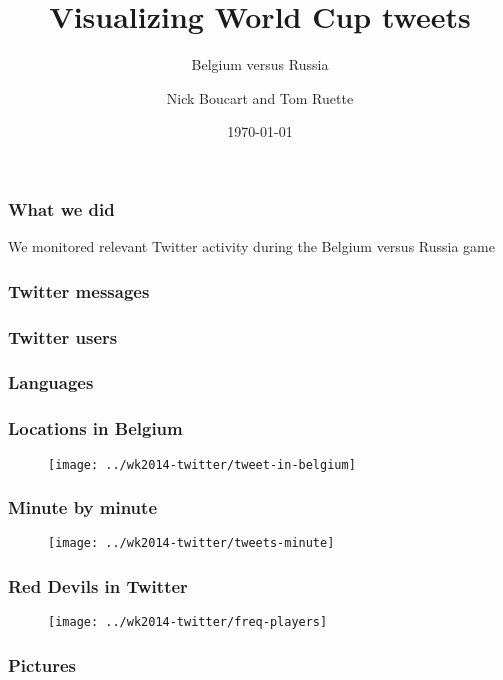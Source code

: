 \documentclass{beamer}
\title[\#belrus]{Visualizing World Cup tweets}
\subtitle{Belgium versus Russia}
\author[Sirris]{Nick Boucart and Tom Ruette}
\institute[Sirris]{Sirris, Collective Centre for the Belgian Technological Industry}
\date{\today}
\begin{document}
  \frame{\titlepage}

  \begin{frame}
    \frametitle{What we did}
      We monitored relevant Twitter activity during the Belgium versus Russia game
  \end{frame}

  \begin{frame}
    \frametitle{Twitter messages}
   
  \end{frame}

  \begin{frame}
    \frametitle{Twitter users}
   
  \end{frame}

  \begin{frame}
    \frametitle{Languages}
   
  \end{frame}

  \begin{frame}
    \frametitle{Locations in Belgium}
    \begin{figure}
      \centering
      \texttt{[image: ../wk2014-twitter/tweet-in-belgium]}
    \end{figure}
  \end{frame}

  \begin{frame}
    \frametitle{Minute by minute}
    \begin{figure}
      \centering
      \texttt{[image: ../wk2014-twitter/tweets-minute]}
    \end{figure}
  \end{frame}

  \begin{frame}
    \frametitle{Red Devils in Twitter}
    \begin{figure}
      \centering
      \texttt{[image: ../wk2014-twitter/freq-players]}
    \end{figure}
  \end{frame}

  \begin{frame}
    \frametitle{Pictures}
    
  \end{frame}
\end{document}
